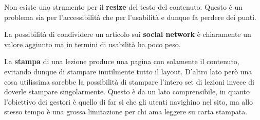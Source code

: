 Non esiste uno strumento per il \textbf{resize} del testo del contenuto. Questo è un problema sia per l'accessibilità che per l'usabilità e dunque fa perdere dei punti.

La possibilità di condividere un articolo sui \textbf{social network} è chiaramente un valore aggiunto ma in termini di usabilità ha poco peso.

La \textbf{stampa} di una lezione produce una pagina con solamente il contenuto, evitando dunque di stampare inutilmente tutto il layout. D'altro lato però una cosa utilissima sarebbe la possibilità di stampare l'intero set di lezioni invece di doverle stampare singolarmente. Questo è da un lato comprensibile, in quanto l'obiettivo dei gestori è quello di far sì che gli utenti navighino nel sito, ma allo stesso tempo è una grossa limitazione per chi ama leggere su carta stampata.
